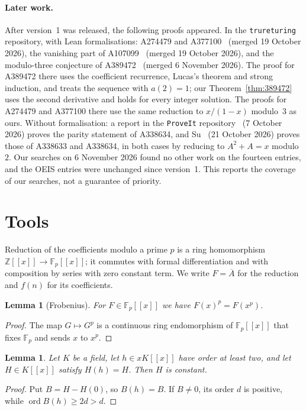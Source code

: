 \documentclass[11pt]{article}
\newtheorem{lemma}[theorem]{Lemma}
\theoremstyle{remark}
\newcommand{\F}{\mathbb F}
\newcommand{\Z}{\mathbb Z}
\newcommand{\ord}{\operatorname{ord}}
\begin{document}
\paragraph{Later work.} After version~1 was released, the following proofs
appeared. In the \texttt{trureturing} repository, with Lean formalisations:
A274479 and A377100~\cite{tru19207} (merged 19 October 2026), the vanishing part
of A107099~\cite{tru19258} (merged 19 October 2026), and the modulo-three
conjecture of A389472~\cite{tru26856} (merged 6 November 2026). The proof for
A389472 there uses the coefficient recurrence, Lucas's theorem and strong
induction, and treats the sequence with $a(2)=1$; our
Theorem~\ref{thm:389472} uses the second derivative and holds for every integer
solution. The proofs for A274479 and A377100 there use the same reduction to
$x/(1-x)$ modulo~$3$ as ours. Without formalisation: a report in the
\texttt{ProveIt} repository~\cite{proveit} (7 October 2026) proves the parity
statement of A338634, and Su~\cite{su} (21 October 2026) proves those of A338633
and A338634, in both cases by reducing to $A^2+A=x$ modulo~$2$. Our searches on
6 November 2026 found no other work on the fourteen entries, and the OEIS entries
were unchanged since version~1. This reports the coverage of our searches, not a
guarantee of priority.

\section{Tools}\label{sec:tools}
Reduction of the coefficients modulo a prime $p$ is a ring homomorphism
$\Z[[x]]\to\F_p[[x]]$; it commutes with formal differentiation and with
composition by series with zero constant term. We write $F=\overline A$ for
the reduction and $f(n)$ for its coefficients.

\begin{lemma}[Frobenius]\label{lem:frob}
For $F\in\F_p[[x]]$ we have $F(x)^p=F(x^p)$.
\end{lemma}
\begin{proof}
The map $G\mapsto G^p$ is a continuous ring endomorphism of $\F_p[[x]]$
that fixes $\F_p$ and sends $x$ to $x^p$.
\end{proof}

\begin{lemma}\label{lem:fixed}
Let $K$ be a field, let $h\in xK[[x]]$ have order at least two, and let
$H\in K[[x]]$ satisfy $H(h)=H$. Then $H$ is constant.
\end{lemma}
\begin{proof}
Put $B=H-H(0)$, so $B(h)=B$. If $B\ne0$, its order $d$ is positive, while
$\ord B(h)\ge2d>d$.
\end{proof}
\end{document}

